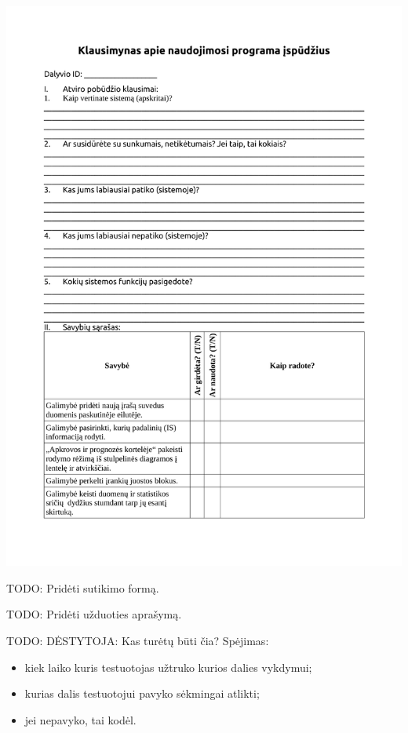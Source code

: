 \newpage
\noindent\includegraphics[scale=0.85, page=3]{./4/pdfs/klausimynas1.pdf}

TODO: Pridėti sutikimo formą.

TODO: Pridėti užduoties aprašymą.

\newpage
{}

TODO: DĖSTYTOJA: Kas turėtų būti čia? Spėjimas:
\begin{itemize}
  \item kiek laiko kuris testuotojas užtruko kurios dalies vykdymui;
  \item kurias dalis testuotojui pavyko sėkmingai atlikti;
  \item jei nepavyko, tai kodėl.
\end{itemize}
